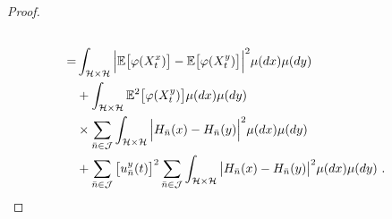 \documentclass[review,onefignum,onetabnum]{siamart190516}
\begin{document}
\begin{proof}
\begin{equation}
\begin{aligned}
                    \\
                    =&
                    \int_{\mathcal{H}\times \mathcal{H}}
                    \Big|
                        \mathbb{E}\big[
                            \varphi(X_t^x)
                        \big]
                        -
                        \mathbb{E}\big[
                            \varphi(X_t^y)
                        \big]
                    \Big|^2
                    \mu(dx)\mu(dy)
                    \\
                    &+
                    \int_{\mathcal{H}\times \mathcal{H}}
                    \mathbb{E} ^ 2\big[
                        \varphi(X_t^y)
                    \big] \mu(dx) \mu(dy)
                    \\
                    & \times
                    \sum_{\bar n\in \mathcal{J}}
                    \int_{\mathcal{H}\times \mathcal{H}}
                    \Big|
                        H_{\bar n}(x) - H_{\bar n}(y)
                    \Big|^2  \mu(dx)\mu(dy)
                    \\
                    &+
                    \sum_{\bar n\in \mathcal{J}}
                    \big[
                        u_{\bar n}^y(t)
                    \big]^2
                    \sum_{\bar n\in \mathcal{J}}
                    \int_{\mathcal{H}\times \mathcal{H}}
                    \big|
                        H_{\bar n}(x) - H_{\bar n}(y)
                    \big|^2 \mu(dx)\mu(dy)
                    \ .
            \end{aligned}
        \end{equation}
        

\end{proof}
\end{document}

